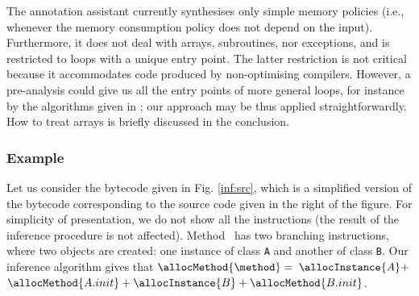


The annotation assistant currently synthesises only simple memory
policies (i.e., whenever the memory consumption policy does not depend
on the input).  Furthermore, it does not deal with arrays,
subroutines, nor exceptions, and is restricted to loops with a unique
entry point. The latter restriction is not critical because it
accommodates code produced by non-optimising compilers. However, a
pre-analysis could give us all the entry points of more general loops,
for instance by the algorithms given in \cite{CJPS05cmu}; our approach
may be thus applied straightforwardly. How to treat arrays is
briefly discussed in the conclusion.


\subsubsection{Example}

Let us consider the bytecode given in Fig. \ref{inf:src}, which is a
simplified version of the bytecode corresponding to the source code
given in the right of the figure. For simplicity of presentation, we
do not show all the instructions (the result of the inference
procedure is not affected). Method \method\ has two branching
instructions, where two objects are created: one instance of class \texttt{A}
and another of class \texttt{B}. Our inference algorithm gives that
$\allocMethod{\method} =$ $\allocInstance{A} +$ $\allocMethod{A.init}
+ \allocInstance{B} + \allocMethod{B.init}$.

